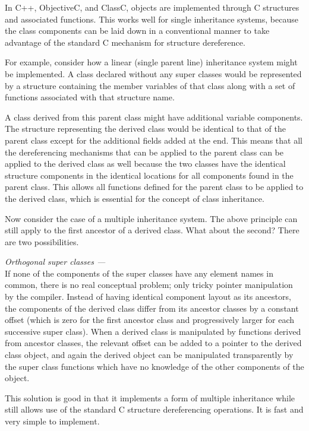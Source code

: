 In C++, ObjectiveC, and ClassC, objects are implemented through C structures
and associated functions.  This works well for single inheritance systems,
because the class components can be laid down in a conventional
manner to take advantage of the standard C mechanism for structure
dereference.

For example, consider how a linear (single parent line) inheritance system
might be implemented.  A class declared without any super classes would be
represented by a structure containing the member variables of that class
along with a set of functions associated with that structure name.

A class derived from this parent class might have additional variable
components.  The structure representing the derived class would be identical
to that of the parent class except for the additional fields added at the
end.  This means that all the dereferencing mechanisms that can be applied
to the parent class can be applied to the derived class as well because the
two classes have the identical structure components in the identical
locations for all components found in the parent class.  This allows all
functions defined for the parent class to be applied to the derived class,
which is essential for the concept of class inheritance.

Now consider the case of a multiple inheritance system.  The above principle
can still apply to the first ancestor of a derived class.  What about the
second?  There are two possibilities.


{\em Orthogonal super classes ---\\}
If none of the components of the super classes have any element names in
common, there is no real conceptual problem; only tricky pointer
manipulation by the compiler.  Instead of having identical component layout
as its ancestors, the components of the derived class differ from its
ancestor classes by a constant offset (which is zero for the first ancestor
class and progressively larger for each successive super class).  When a
derived class is manipulated by functions derived from ancestor classes,
the relevant offset can be added to a pointer to the derived class object,
and again the derived object can be manipulated transparently by the super
class functions which have no knowledge of the other components of the
object.

This solution is good in that it implements a form of multiple inheritance
while still allows use of the standard C
structure dereferencing operations.  It is fast and very simple to
implement.

